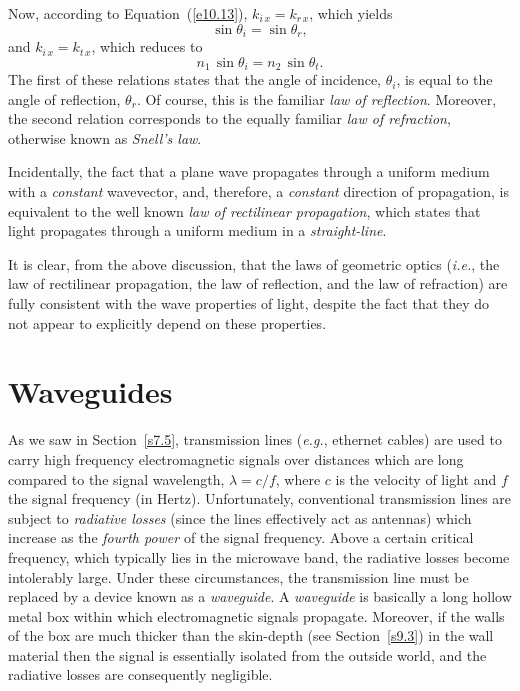 Now, according to Equation~(\ref{e10.13}), $k_{i\,x}= k_{r\,x}$, which yields
\begin{equation}
\sin\theta_i=\sin\theta_r,
\end{equation}
and $k_{i\,x}=k_{t\,x}$, which reduces to
\begin{equation}
n_1\,\sin\theta_i = n_2\,\sin\theta_t.
\end{equation}
The first of these relations states that the angle of incidence, $\theta_i$, is equal to the angle of reflection, $\theta_r$.  Of course, this is the
familiar {\em law of reflection}. Moreover, the second relation corresponds to the equally familiar
{\em law of refraction}, otherwise known as {\em Snell's law}. 

Incidentally, the fact that a plane wave propagates through a uniform
medium with a {\em constant}\/ wavevector, and, therefore, a {\em constant}\/ direction of propagation, is equivalent to the well known {\em law of rectilinear propagation}, which
states that light propagates through a uniform medium in a {\em straight-line}. 

It is clear, from the above discussion, that  the  laws of geometric optics ({\em i.e.}, the law
of rectilinear propagation, the law of reflection, and the law of refraction) are  fully consistent with the 
wave properties of light, despite the fact that they do not  appear to explicitly depend on these properties. 

\section{Waveguides}
As we saw in Section~\ref{s7.5}, transmission lines ({\em e.g.}, ethernet cables)  are used to carry high frequency electromagnetic signals over distances which are long compared to the signal wavelength, $\lambda = c/f$, where $c$ is the velocity of light and $f$ the signal frequency (in Hertz). 
Unfortunately, conventional transmission lines are subject to {\em radiative losses}\/ (since the lines effectively act as antennas) 
which increase as the {\em fourth power}\/ of the signal frequency. Above a certain critical  frequency, which typically
lies in the microwave band, the radiative losses become intolerably large. Under these circumstances, the transmission line must be
replaced by a device known as a {\em waveguide}. A {\em waveguide}\/ is basically a long  hollow metal box  within
which electromagnetic signals propagate. Moreover, if the walls of the box are much thicker than the skin-depth (see Section~\ref{s9.3}) in the wall material then
the signal is essentially isolated from the outside world, and the radiative losses are consequently negligible. 

